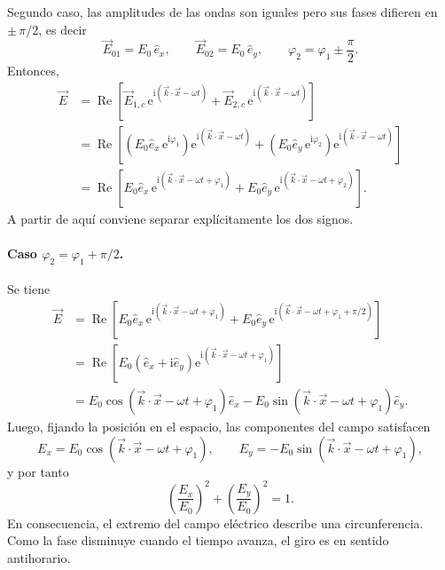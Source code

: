 \documentclass[12pt,a4paper]{article}
\theoremstyle{definition}
\theoremstyle{plain}
\numberwithin{equation}{section}
\theoremstyle{remark}
\newcommand{\ii}{\mathrm{i}}
\newcommand{\ee}{\mathrm{e}}
\begin{document}
Segundo caso, las amplitudes de las ondas son iguales pero sus fases difieren en $\pm\,\pi/2$, es decir
\begin{equation*}
    \vec E_{01}=E_0\,\hat e_x,
    \qquad
    \vec E_{02}=E_0\,\hat e_y,
    \qquad
    \varphi_2=\varphi_1\pm\frac{\pi}{2}.
\end{equation*}
Entonces,
\begin{align*}
    \vec E &= \operatorname{Re}\left[\vec E_{1,c}\,\ee^{\ii\left(\vec k\cdot\vec x-\omega t\right)}+\vec E_{2,c}\,\ee^{\ii\left(\vec k\cdot\vec x-\omega t\right)}\right] \\
    &= \operatorname{Re}\left[\left(E_0\hat e_x\,\ee^{\ii\varphi_1}\right)\ee^{\ii\left(\vec k\cdot\vec x-\omega t\right)}+\left(E_0\hat e_y\,\ee^{\ii\varphi_2}\right)\ee^{\ii\left(\vec k\cdot\vec x-\omega t\right)}\right] \\
    &= \operatorname{Re}\left[E_0\hat e_x\,\ee^{\ii\left(\vec k\cdot\vec x-\omega t+\varphi_1\right)}+E_0\hat e_y\,\ee^{\ii\left(\vec k\cdot\vec x-\omega t+\varphi_2\right)}\right].
\end{align*}
A partir de aquí conviene separar explícitamente los dos signos.

\paragraph{Caso $\varphi_2=\varphi_1+\pi/2$.}
Se tiene
\begin{align*}
    \vec E
    &= \operatorname{Re}\left[E_0\hat e_x\,\ee^{\ii\left(\vec k\cdot\vec x-\omega t+\varphi_1\right)}+E_0\hat e_y\,\ee^{\ii\left(\vec k\cdot\vec x-\omega t+\varphi_1+\pi/2\right)}\right] \\
    &= \operatorname{Re}\left[E_0\left(\hat e_x+\ii\hat e_y\right)\ee^{\ii\left(\vec k\cdot\vec x-\omega t+\varphi_1\right)}\right] \\
    &= E_0\cos\left(\vec k\cdot\vec x-\omega t+\varphi_1\right)\hat e_x-E_0\sin\left(\vec k\cdot\vec x-\omega t+\varphi_1\right)\hat e_y.
\end{align*}
Luego, fijando la posición en el espacio, las componentes del campo satisfacen
\begin{equation*}
    E_x=E_0\cos\left(\vec k\cdot\vec x-\omega t+\varphi_1\right),
    \qquad
    E_y=-E_0\sin\left(\vec k\cdot\vec x-\omega t+\varphi_1\right),
\end{equation*}
y por tanto
\begin{equation*}
    \left(\frac{E_x}{E_0}\right)^2+\left(\frac{E_y}{E_0}\right)^2=1.
\end{equation*}
En consecuencia, el extremo del campo eléctrico describe una circunferencia. Como la fase disminuye cuando el tiempo avanza, el giro es en sentido antihorario.
\end{document}
